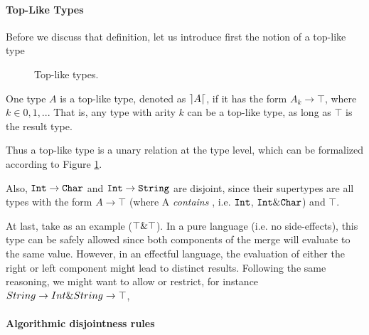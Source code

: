 \paragraph{Top-Like Types}
Before we discuss that definition, let us introduce first the notion of a top-like type 

\begin{figure}[t]
  \caption{Top-like types.}
  \label{fig:fi-toplike}
\end{figure}

\begin{definition}
  
  One type $A$ is a top-like type, denoted as $\rceil A \lceil$, if it has the form $A_k \to \top$, where $k \in {0,1,..}$.
  That is, any type with arity $k$ can be a top-like type, as long as $\top$ is the result type. 

\end{definition}
Thus a top-like type is a unary relation at the type level, which can be formalized according to Figure \ref{fig:fi-toplike}.

Also, $\texttt{Int} \to \texttt{Char}$ and $\texttt{Int} \to \texttt{String}$ are disjoint, 
since their supertypes are all types with the form $A \to \top$ 
(where A \emph{contains} , i.e. $\texttt{Int}$, $\texttt{Int} \& \texttt{Char}$) and $\top$.


At last, take as an example ($\top \& \top$).
In a pure language (i.e. no side-effects), this type can be safely allowed since both components of the merge
will evaluate to the same value. 
However, in an effectful language, the evaluation of either the right or left component might lead to distinct results. 
Following the same reasoning, we might want to allow or restrict, for instance $String \to Int \& String \to \top$,  

\paragraph{Algorithmic disjointness rules}

